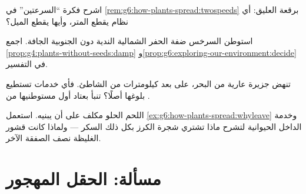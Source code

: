 \begin{exercise}[$\star\star$]\label{exo:g6:how-plants-spread:9}
اشرح فكرة ``السرعتين'' في \cref{rem:g6:how-plants-spread:twospeeds}
برقعة العليق: أي نظام يقطع المتر، وأيها يقطع الميل؟
\end{exercise}

\begin{exercise}[$\star\star$]\label{exo:g6:how-plants-spread:10}
استوطن السرخس ضفة الحفر الشمالية الندية دون الجنوبية الجافة. اجمع
\cref{prop:g4:plants-without-seeds:damp}
و\cref{prop:g6:exploring-our-environment:decide} في التفسير.
\end{exercise}

\begin{exercise}[$\star\star$]\label{exo:g6:how-plants-spread:11}
تنهض جزيرة عارية من البحر، على بعد كيلومترات من الشاطئ. فأي خدمات
 تستطيع بلوغها أصلًا؟ تنبأ بعتاد أول مستوطنيها من .
\end{exercise}

\begin{exercise}[$\star\star\star$]\label{exo:g6:how-plants-spread:12}
اللحم الحلو مكلف على  أن يبنيه. استعمل
\cref{ex:g6:how-plants-spread:whyleave} وخدمة الداخل الحيوانية
لتشرح ماذا تشتري شجرة الكرز بكل ذلك السكر --- ولماذا كانت قشور
 الغليظة نصف الصفقة الآخر.
\end{exercise}

\section{مسألة: الحقل المهجور}


